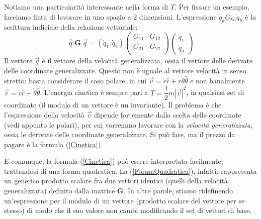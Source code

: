 \documentclass[a4paper,openany]{article}
\begin{document}
	Notiamo una particolarità interessante nella forma di $T$. Per fissare un esempio, facciamo finta di lavorare in uno spazio a 2 dimensioni. L'espressione $\dot{q}_{k}G_{kh}\dot{q}_{h}$ è la scrittura indiciale della relazione vettoriale:
	\begin{equation}
		\dot{\vec{q}}\>\textbf{G}\>\dot{\vec{q}} =
		(\dot{q}_{1}, \dot{q}_{2})
		\begin{pmatrix}
			G_{11} & G_{12} \\
			G_{21} & G_{22} \\
		\end{pmatrix}
		\begin{pmatrix}
			\dot{q}_{1} \\ \dot{q}_{2}
		\end{pmatrix}
		\label{FormaQuadratica}
	\end{equation}
	Il vettore $\dot{\vec{q}}$ è il vettore della velocità generalizzata, ossia il vettore delle derivate delle coordinate generalizzate. Questo non è uguale al vettore velocità in senso stretto: basta considerare il caso polare, in cui $\vec{v} = \dot{r}\hat{r} + r\dot{\theta}\hat\theta$ e non banalmente $\vec{v} = \dot{r}\hat{r}+\dot{\theta}\hat{\theta}$. L'energia cinetica è sempre pari a $T = \dfrac{1}{2}m|\vec{v}|^{2}$, in qualsiasi set di coordinate (il modulo di un vettore è un invariante). Il problema è che l'espressione della velocità $\vec{v}$ dipende fortemente dalla scelta delle coordinate (vedi appunto le polari), per cui vorremmo lavorare con la \textit{velocità generalizzata}, ossia le derivate delle coordinate generalizzate. Si può fare, ma il prezzo da pagare è la formula (\ref{Cinetica}).
	
	E comunque, la formula (\ref{Cinetica}) può essere interpretata facilmente, trattandosi di una forma quadratica. La (\ref{FormaQuadratica}), infatti, rappresenta un generico prodotto scalare fra due vettori identici (quelli della velocità generalizzata) definito dalla matrice $\mathbf{G}$. In altre parole, stiamo ridefinendo un'espressione per il modulo di un vettore (prodotto scalare del vettore per se stesso) di modo che il suo valore non cambi modificando il set di vettori di base.
	
\end{document}
